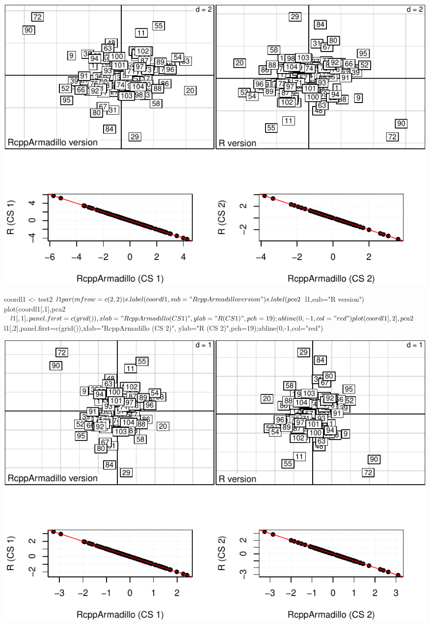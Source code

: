 \documentclass[
  10pt,
]{article}
\newenvironment{Shaded}{\begin{snugshade}}{\end{snugshade}}
\newcommand{\NormalTok}[1]{#1}
\begin{document}
\includegraphics{RandPytonAnalysisPDF_files/figure-latex/unnamed-chunk-54-1.pdf}

\begin{Shaded}
\begin{Highlighting}[]
\NormalTok{coordl1 \textless{}{-} test2$l1}
\NormalTok{par(mfrow=c(2,2))}
\NormalTok{s.label(coordl1,sub="RcppArmadillo version")}
\NormalTok{s.label(pca2$l1,sub="R version")}
\NormalTok{plot(coordl1[,1],pca2$l1[,1],panel.first=c(grid()),xlab="RcppArmadillo (CS 1)",}
\NormalTok{     ylab="R (CS 1)",pch=19);abline(0,{-}1,col="red")}
\NormalTok{plot(coordl1[,2],pca2$l1[,2],panel.first=c(grid()),xlab="RcppArmadillo (CS 2)",}
\NormalTok{     ylab="R (CS 2)",pch=19);abline(0,{-}1,col="red")}
\end{Highlighting}
\end{Shaded}

\includegraphics{RandPytonAnalysisPDF_files/figure-latex/unnamed-chunk-55-1.pdf}
\end{document}
